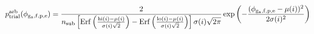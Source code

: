\documentclass[12pt]{article}
\begin{document}
\begin{displaymath}
p_{\rm trial}^{\rm arb}(\phi_{\rm g_a,f,p,e}) = 
{
{2}
\over
{
n_{\rm sub}
\left[
{\rm Erf}\left({{{\rm hi}(i)-\mu(i)}\over{\sigma(i) \sqrt{2}}}\right)
- {\rm Erf}\left({{{\rm lo}(i)-\mu(i)}\over{\sigma(i) \sqrt{2}}}\right)
\right]
\sigma(i) \sqrt{2 \pi}
}
}
\exp\left(-{{(\phi_{\rm g_a,f,p,e} - \mu(i))^2}\over{2 \sigma(i)^2}}\right)
\end{displaymath}
\end{document}
